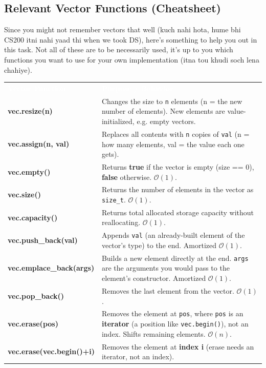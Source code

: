 \documentclass[11pt]{article}
\begin{document}
\newpage
\subsection{Relevant Vector Functions (Cheatsheet)}

Since you might not remember vectors that well (kuch nahi hota, hume bhi CS200 itni nahi yaad thi when we took DS), here's something to help you out in this task. Not all of these are to be necessarily used, it's up to you which functions you want to use for your own implementation (itna tou khudi soch lena chahiye).

\vspace{0.3cm}
\begingroup
{}
\noindent
\begin{tabularx}{\textwidth}{>{\ttfamily\bfseries}l X}
\rowcolor{cheatHeader}
\textcolor{white}{\textbf{Vector Function}} & \textcolor{white}{\textbf{Purpose / Behavior}} \\
vec.resize(n) & Changes the size to \texttt{n} elements (n = the new number of elements). New elements are value-initialized, e.g. empty vectors. \\
vec.assign(n, val) & Replaces all contents with \texttt{n} copies of \texttt{val} (n = how many elements, val = the value each one gets). \\
vec.empty() & Returns \textbf{true} if the vector is empty (size == 0), \textbf{false} otherwise. $\mathcal{O}(1)$. \\
vec.size() & Returns the number of elements in the vector as \texttt{size\_t}. $\mathcal{O}(1)$. \\
vec.capacity() & Returns total allocated storage capacity without reallocating. $\mathcal{O}(1)$. \\
vec.push\_back(val) & Appends \texttt{val} (an already-built element of the vector's type) to the end. Amortized $\mathcal{O}(1)$. \\
vec.emplace\_back(args) & Builds a new element directly at the end. \texttt{args} are the arguments you would pass to the element's constructor. Amortized $\mathcal{O}(1)$. \\
vec.pop\_back() & Removes the last element from the vector. $\mathcal{O}(1)$. \\
vec.erase(pos) & Removes the element at \texttt{pos}, where \texttt{pos} is an \textbf{iterator} (a position like \texttt{vec.begin()}), not an index. Shifts remaining elements. $\mathcal{O}(n)$. \\
vec.erase(vec.begin()+i) & Removes the element at \textbf{index i} (erase needs an iterator, not an index). \\

\end{tabularx}
\end{document}
